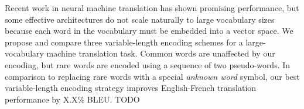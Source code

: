 Recent work in neural machine translation has shown promising performance, but some effective
architectures do not scale naturally to large vocabulary sizes because each
word in the vocabulary must be embedded into a vector space. We propose and compare
three variable-length encoding schemes for a large-vocabulary machine
translation task. Common words are unaffected by our encoding, but rare
words are encoded using a sequence of two pseudo-words. In comparison to
replacing rare words with a special \emph{unknown word} symbol, our best
variable-length encoding strategy improves English-French translation
performance by X.X\% BLEU. TODO
